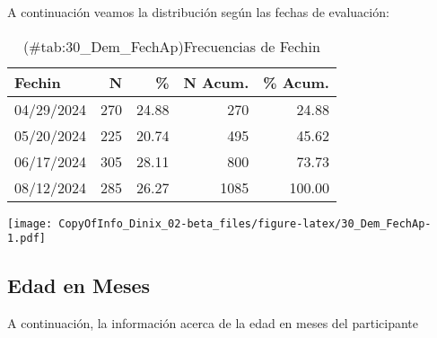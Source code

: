 \documentclass[
]{article}
\begin{document}
A continuación veamos la distribución según las fechas de evaluación:

\begin{table}

\caption{(\#tab:30_Dem_FechAp)Frecuencias de Fechin}
\centering
\begin{tabular}[t]{lrrrr}
\toprule
Fechin & N & \% & N Acum. & \% Acum.\\
\midrule
04/29/2024 & 270 & 24.88 & 270 & 24.88\\
05/20/2024 & 225 & 20.74 & 495 & 45.62\\
06/17/2024 & 305 & 28.11 & 800 & 73.73\\
08/12/2024 & 285 & 26.27 & 1085 & 100.00\\
\bottomrule
\end{tabular}
\end{table}

\texttt{[image: CopyOfInfo\_Dinix\_02-beta\_files/figure-latex/30\_Dem\_FechAp-1.pdf]}

\subsection{Edad en Meses}\label{edad-en-meses}

A continuación, la información acerca de la edad en meses del participante
\end{document}
